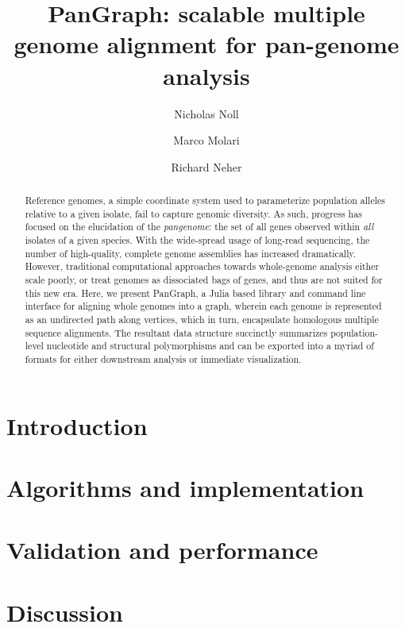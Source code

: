 \documentclass[aps,rmp,superscriptaddress,notitlepage,10pt]{revtex4-1}
\begin{document}
\title{PanGraph: scalable multiple genome alignment for pan-genome analysis}
\author{Nicholas Noll}
\author{Marco Molari}
\author{Richard Neher}

\begin{abstract}
    Reference genomes, a simple coordinate system used to parameterize population alleles relative to a given isolate, fail to capture genomic diversity.
    As such, progress has focused on the elucidation of the \emph{pangenome}: the set of all genes observed within \emph{all} isolates of a given species.
    With the wide-spread usage of long-read sequencing, the number of high-quality, complete genome assemblies has increased dramatically.
    However, traditional computational approaches towards whole-genome analysis either scale poorly, or treat genomes as dissociated bags of genes, and thus are not suited for this new era.
    Here, we present PanGraph, a Julia based library and command line interface for aligning whole genomes into a graph, wherein each genome is represented as an undirected path along vertices, which in turn, encapsulate homologous multiple sequence alignments.
    The resultant data structure succinctly summarizes population-level nucleotide and structural polymorphisms and can be exported into a myriad of formats for either downstream analysis or immediate visualization.
\end{abstract}

\maketitle

\section{Introduction}
\section{Algorithms and implementation}
\section{Validation and performance}
\section{Discussion}
\end{document}
